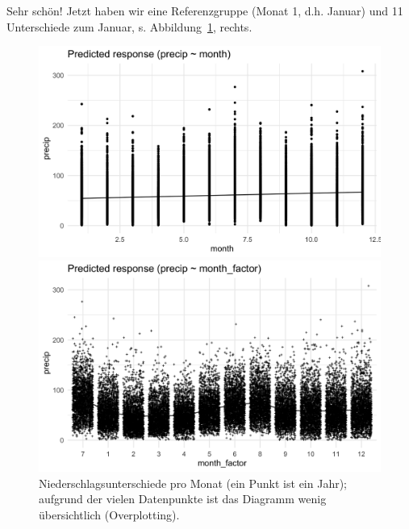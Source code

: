 \documentclass[
  a4paper,
]{scrbook}
\theoremstyle{definition}
\theoremstyle{definition}
\theoremstyle{definition}
\theoremstyle{remark}
\begin{document}
Sehr schön! Jetzt haben wir eine Referenzgruppe (Monat 1, d.h. Januar)
und 11 Unterschiede zum Januar, s. Abbildung~\ref{fig-wetter-month},
rechts.

\begin{figure}

\begin{minipage}{0.50\linewidth}

\includegraphics{img/fig-precip-month-num.png}

\end{minipage}%
%
\begin{minipage}{0.50\linewidth}

\includegraphics{img/fig-precip-month.png}

\end{minipage}%

\caption{\label{fig-wetter-month}Niederschlagsunterschiede pro Monat
(ein Punkt ist ein Jahr); aufgrund der vielen Datenpunkte ist das
Diagramm wenig übersichtlich (Overplotting).}

\end{figure}%
\end{document}
